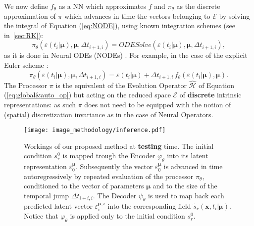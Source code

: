 We now define $f_\theta$ as a NN which approximates $f$ and $\pi_\theta$ as the discrete approximation of $\pi$ which advances in time the vectors belonging to $\mathcal{E}$ by solving the integral of Equation (\ref{eq:NODE}), using known integration schemes (see in~\ref{sec:RK}):
\begin{equation}
   \pi_\theta(\varepsilon(t_{i}|\pmb{\mu}), \pmb{\mu},\Delta t_{i+1,i}) = ODESolve(\varepsilon(t_{i}|\pmb{\mu}),\pmb{\mu},\Delta t_{i+1,i}),
\end{equation}
as it is done in Neural ODEs (NODEs) \cite{chen2018neural,Kidger2022OnND}.
For example, in the case of the explicit Euler scheme \cite{Ascher1998ComputerMF}:
\begin{equation}
   \pi_\theta(\varepsilon(t_{i}|\pmb{\mu}),\pmb{\mu},\Delta t_{i+1,i}) = \varepsilon(t_i|\pmb{\mu})+\Delta t_{i+1,i}\,f_\theta(\varepsilon(t_{i}|\pmb{\mu}),\pmb{\mu}).
\end{equation}
The Processor $\pi$ is the equivalent of the Evolution Operator $\hat{\mathcal{H}}$ of Equation (\ref{eq:global&auto_op}) but acting on the reduced space $\mathcal{E}$ of \textbf{discrete} intrinsic representations: as such $\pi$ does not need to be equipped with the notion of (spatial) discretization invariance as in the case of Neural Operators. 
\begin{figure*}
  \centering
  \texttt{[image: image\_methodology/inference.pdf]}
  \caption{Workings of our proposed method at \textbf{testing} time. The initial condition $s^0_r$ is mapped trough the Encoder $\varphi_\theta$ into its latent representation $\varepsilon_0^{\pmb{\mu}}$. Subsequently the vector $\varepsilon_0^{\pmb{\mu}}$ is advanced in time autoregressively by repeated evaluation of the processor $\pi_\theta$, conditioned to the vector of parameters $\pmb{\mu}$ and to the size of the temporal jump $\Delta t_{i+i,i}$. The Decoder $\psi_\theta$ is used to map back each predicted latent vector $\varepsilon_{i}^{\pmb{\mu},i}$ into the corresponding field $\tilde{s}_r(\mathbf{x},t_i|\pmb{\mu})$. Notice that $\varphi_\theta$ is applied only to the initial condition $s_r^0$.}
  \label{fig:inference}
\end{figure*}
